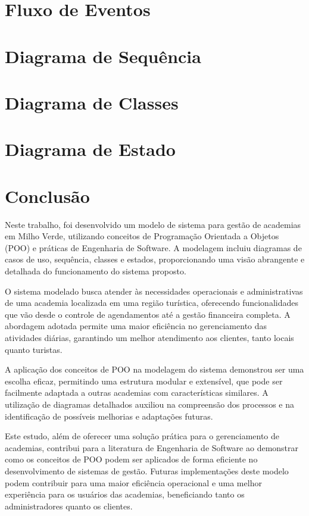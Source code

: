 \documentclass{article}
\begin{document}
\section{Fluxo de Eventos}


\section{Diagrama de Sequência}


\section{Diagrama de Classes}


\section{Diagrama de Estado}


\newpage %
\section{Conclusão}
Neste trabalho, foi desenvolvido um modelo de sistema para gestão de academias em Milho Verde, utilizando conceitos de Programação Orientada a Objetos (POO) e práticas de Engenharia de Software. A modelagem incluiu diagramas de casos de uso, sequência, classes e estados, proporcionando uma visão abrangente e detalhada do funcionamento do sistema proposto.

O sistema modelado busca atender às necessidades operacionais e administrativas de uma academia localizada em uma região turística, oferecendo funcionalidades que vão desde o controle de agendamentos até a gestão financeira completa. A abordagem adotada permite uma maior eficiência no gerenciamento das atividades diárias, garantindo um melhor atendimento aos clientes, tanto locais quanto turistas.

A aplicação dos conceitos de POO na modelagem do sistema demonstrou ser uma escolha eficaz, permitindo uma estrutura modular e extensível, que pode ser facilmente adaptada a outras academias com características similares. A utilização de diagramas detalhados auxiliou na compreensão dos processos e na identificação de possíveis melhorias e adaptações futuras.

Este estudo, além de oferecer uma solução prática para o gerenciamento de academias, contribui para a literatura de Engenharia de Software ao demonstrar como os conceitos de POO podem ser aplicados de forma eficiente no desenvolvimento de sistemas de gestão. Futuras implementações deste modelo podem contribuir para uma maior eficiência operacional e uma melhor experiência para os usuários das academias, beneficiando tanto os administradores quanto os clientes.

\hfill
\end{document}
